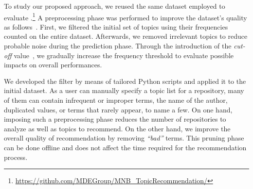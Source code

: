 




To study our proposed approach, we reused the same dataset employed to evaluate \MNB.\footnote{\url{https://github.com/MDEGroup/MNB\_TopicRecommendation/}} A preprocessing phase was performed to improve the dataset's quality as follows~\cite{repo-topix}. First, we filtered the initial set of topics using their frequencies counted on the entire \GH dataset. Afterwards, we removed irrelevant topics to reduce probable noise during the prediction phase. Through the introduction of the \emph{cut-off} value~\cite{10.1145/3383219.3383227}, we gradually increase the frequency threshold to evaluate possible impacts on overall performances. %


We developed the filter by means of tailored Python scripts and applied it to the initial dataset. As a \GH user can manually specify a topic list for a repository, many of them can contain infrequent or improper terms, \ie the name of the author, duplicated values, or terms that rarely appear, to name a few. On one hand, imposing such a preprocessing phase reduces the number of repositories to analyze as well as topics to recommend. On the other hand, we improve the overall quality of recommendation by removing \emph{``bad''} terms. This pruning phase can be done offline and does not affect the time required for the recommendation process.

